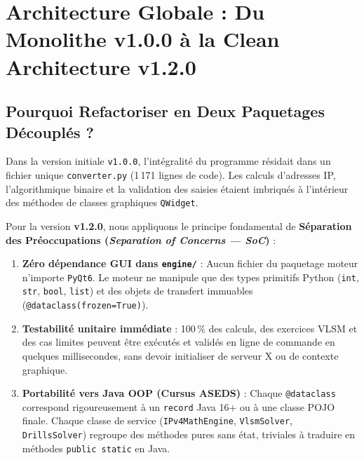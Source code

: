 \documentclass[11pt,a4paper]{report}
\begin{document}
\chapter{Architecture Globale : Du Monolithe v1.0.0 \`a la Clean Architecture v1.2.0}

\section{Pourquoi Refactoriser en Deux Paquetages D\'ecoupl\'es ?}
Dans la version initiale \texttt{v1.0.0}, l'int\'egralit\'e du programme r\'esidait dans un fichier unique \texttt{converter.py} (1\,171 lignes de code). Les calculs d'adresses IP, l'algorithmique binaire et la validation des saisies \'etaient imbriqu\'es \`a l'int\'erieur des m\'ethodes de classes graphiques \texttt{QWidget}.

Pour la version \textbf{v1.2.0}, nous appliquons le principe fondamental de \textbf{S\'eparation des Pr\'eoccupations (\textit{Separation of Concerns --- SoC})} :
\begin{enumerate}
    \item \textbf{Z\'ero d\'ependance GUI dans \texttt{engine/}} : Aucun fichier du paquetage moteur n'importe \texttt{PyQt6}. Le moteur ne manipule que des types primitifs Python (\texttt{int}, \texttt{str}, \texttt{bool}, \texttt{list}) et des objets de transfert immuables (\texttt{@dataclass(frozen=True)}).
    \item \textbf{Testabilit\'e unitaire imm\'ediate} : 100\,\% des calculs, des exercices VLSM et des cas limites peuvent \^etre ex\'ecut\'es et valid\'es en ligne de commande en quelques millisecondes, sans devoir initialiser de serveur X ou de contexte graphique.
    \item \textbf{Portabilit\'e vers Java OOP (Cursus ASEDS)} : Chaque \texttt{@dataclass} correspond rigoureusement \`a un \texttt{record} Java 16+ ou \`a une classe POJO finale. Chaque classe de service (\texttt{IPv4MathEngine}, \texttt{VlsmSolver}, \texttt{DrillsSolver}) regroupe des m\'ethodes pures sans \'etat, triviales \`a traduire en m\'ethodes \texttt{public static} en Java.
\end{enumerate}

\newpage
\end{document}
